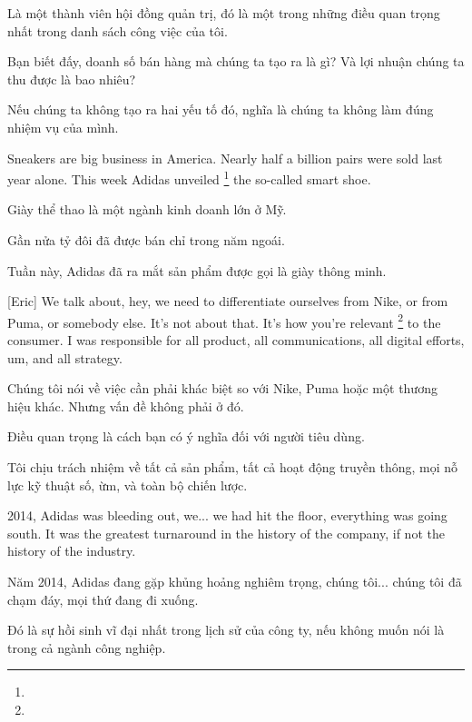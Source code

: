 \documentclass[a4paper]{article}
\begin{document}
	\begin{vietnamese-v2}
		Là một thành viên hội đồng quản trị, đó là một trong những điều quan trọng nhất trong danh sách công việc của tôi.
		
		Bạn biết đấy, doanh số bán hàng mà chúng ta tạo ra là gì? Và lợi nhuận chúng ta thu được là bao nhiêu?
		
		Nếu chúng ta không tạo ra hai yếu tố đó, nghĩa là chúng ta không làm đúng nhiệm vụ của mình.
	\end{vietnamese-v2}
	
	
	Sneakers are big business in America. 
	Nearly half a billion pairs were sold last year alone. 
	This week Adidas unveiled \footnote{} the so-called smart shoe.
	
	\begin{vietnamese-v2}
		Giày thể thao là một ngành kinh doanh lớn ở Mỹ.  
		
		Gần nửa tỷ đôi đã được bán chỉ trong năm ngoái.  
		
		Tuần này, Adidas đã ra mắt sản phẩm được gọi là giày thông minh.
	\end{vietnamese-v2}
	
	
	[Eric] We talk about, hey, we need to differentiate ourselves from Nike, or from Puma, or somebody else. It's not about that.
	It's how you're relevant \footnote{} to the consumer. I was responsible for all product, all communications, all digital efforts, um, and all strategy.
	
	\begin{vietnamese-v2}
		[Eric] Chúng tôi nói về việc cần phải khác biệt so với Nike, Puma hoặc một thương hiệu khác. Nhưng vấn đề không phải ở đó.
		
		Điều quan trọng là cách bạn có ý nghĩa đối với người tiêu dùng.
		
		Tôi chịu trách nhiệm về tất cả sản phẩm, tất cả hoạt động truyền thông, mọi nỗ lực kỹ thuật số, ừm, và toàn bộ chiến lược.
	\end{vietnamese-v2}
	
	2014, Adidas was bleeding out, we... we had hit the floor, everything was going south.
	It was the greatest turnaround in the history of the company, if not the history of the industry.

	\begin{vietnamese-v2}
		Năm 2014, Adidas đang gặp khủng hoảng nghiêm trọng, chúng tôi... chúng tôi đã chạm đáy, mọi thứ đang đi xuống.  
		
		Đó là sự hồi sinh vĩ đại nhất trong lịch sử của công ty, nếu không muốn nói là trong cả ngành công nghiệp.
	\end{vietnamese-v2}
\end{document}
